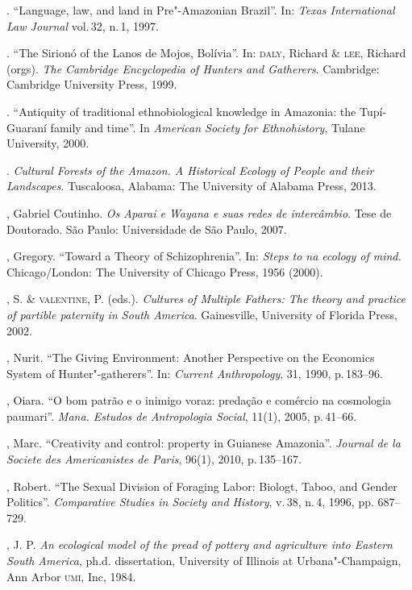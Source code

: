\begin{bibliohedra}
\titidem. ``Language, law, and land in Pre"-Amazonian Brazil''. In:
\emph{Texas International Law Journal} vol.\,32, n.\,1, 1997.

\titidem. ``The Sirionó of the Lanos de Mojos, Bolívia''. In: \textsc{daly}, Richard
\& \textsc{lee}, Richard (orgs). \emph{The Cambridge Encyclopedia of Hunters and
Gatherers}. Cambridge: Cambridge University Press, 1999.

\titidem. ``Antiquity of traditional ethnobiological knowledge in
Amazonia: the Tupí-Guaraní family and time''. In \emph{American Society
for Ethnohistory}, Tulane University, 2000.

\titidem. \emph{Cultural Forests of the Amazon. A Historical
Ecology of People and their Landscapes}. Tuscaloosa, Alabama: The
University of Alabama Press, 2013.

, Gabriel Coutinho. \emph{Os Aparai e Wayana e suas redes de intercâmbio}.
Tese de Doutorado. São Paulo: Universidade de São Paulo, 2007.

, Gregory. ``Toward a Theory of Schizophrenia''. In:
\emph{Steps to na ecology of mind.} Chicago/London: The University of
Chicago Press, 1956 (2000).

, S. \& \textsc{valentine}, P. (eds.).
\emph{Cultures of Multiple Fathers: The theory and
practice of partible paternity in South America}. Gainesville,
University of Florida Press, 2002.

, Nurit. ``The Giving Environment: Another Perspective on the
Economics System of Hunter"-gatherers''. In: \emph{Current Anthropology}, 31, 1990, p.\,183--96.

, Oiara. ``O bom patrão e o inimigo voraz: predação e comércio na
cosmologia paumari''. \emph{Mana. Estudos de Antropologia
Social}, 11(1), 2005, p.\,41--66.

, Marc. ``Creativity and control: property in Guianese
Amazonia''. \emph{Journal de la Societe des Americanistes de Paris},
96(1), 2010, p.\,135--167.

, Robert. ``The Sexual Division of Foraging Labor: Biologt, Taboo,
and Gender Politics''. \emph{Comparative Studies in Society and History},
v.\,38, n.\,4, 1996, pp. 687--729.

, J. P. \emph{An ecological model of the pread of pottery and
agriculture into Eastern South America}, ph.d. dissertation, University
of Illinois at Urbana"-Champaign, Ann Arbor \textsc{umi}, Inc, 1984.


\end{bibliohedra}
